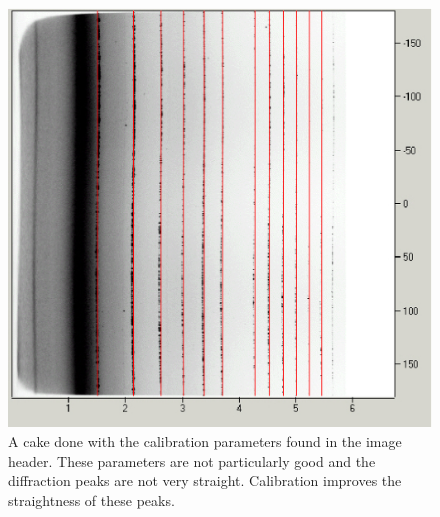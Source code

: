 \begin{figure}
    \centering
    \includegraphics[scale=.75]
    {figures/bad_calibration_cake.eps}
    \caption{A cake done with the calibration parameters
    found in the image header. These parameters
    are not particularly good and the diffraction peaks
    are not very straight. Calibration improves
    the straightness of these peaks.}
    \label{bad_calibration_cake}
\end{figure}

